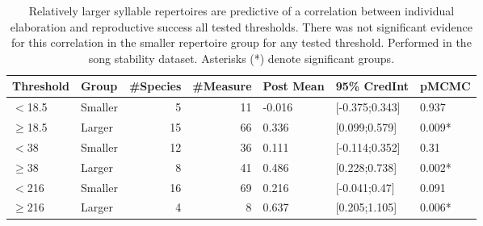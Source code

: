 \documentclass{article}
\begin{document}
  \begin{table}[H]
  \centering
  \caption{Relatively larger syllable repertoires are predictive of a correlation between individual elaboration and reproductive success all tested thresholds. There was not significant evidence for this correlation in the smaller repertoire group for any tested threshold. Performed in the song stability dataset. Asterisks (*) denote significant groups.} 
  \begin{tabular}{llrrlll}
  \hline
  Threshold & Group & \#Species & \#Measure & Post Mean & 95\% CredInt & pMCMC \\ 
  \hline
  $<$18.5 & Smaller & 5 & 11 & -0.016 & [-0.375;0.343] & 0.937 \\ 
  $\ge$18.5 & Larger & 15 & 66 & 0.336 & [0.099;0.579] & 0.009* \\ 
  $<$38 & Smaller & 12 & 36 & 0.111 & [-0.114;0.352] & 0.31 \\ 
  $\ge$38 & Larger & 8 & 41 & 0.486 & [0.228;0.738] & 0.002* \\ 
  $<$216 & Smaller & 16 & 69 & 0.216 & [-0.041;0.47] & 0.091 \\ 
  $\ge$216 & Larger & 4 & 8 & 0.637 & [0.205;1.105] & 0.006* \\ 
  \hline
  \end{tabular}
  \end{table}
  
\end{document}
